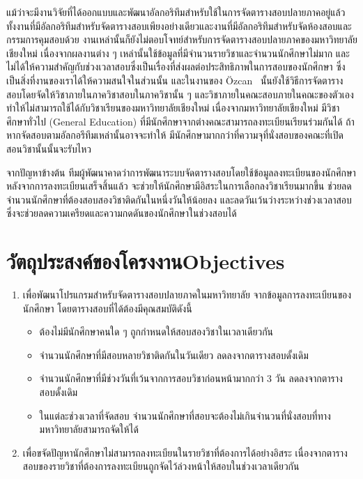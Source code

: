แม้ว่าจะมีงานวิจัยที่ได้ออกแบบและพัฒนาอัลกอริทึมสำหรับใช้ในการจัดตารางสอบปลายภาคอยู่แล้ว \cite{graphcl-constr-manip} \\ \cite{graphcl-2008}\cite{fes}\cite{graphcl-alter-approach}\cite{graphcl-idepset} 
ทั้งงานที่มีอัลกอริทึมสำหรับจัดตารางสอบเพียงอย่างเดียวและงานที่มีอัลกอริทึมสำหรับจัดห้องสอบและกรรมการคุมสอบด้วย
งานเหล่านั้นก็ยังไม่ตอบโจทย์สำหรับการจัดตารางสอบปลายภาคของมหาวิทยาลัยเชียงใหม่ 
เนื่องจากผลงานต่าง ๆ เหล่านั้นใช้ข้อมูลที่มีจำนวนรายวิชาและจำนวนนักศึกษาไม่มาก และไม่ได้ให้ความสำคัญกับช่วงเวลาสอบซึ่งเป็นเรื่องที่ส่งผลต่อประสิทธิภาพในการสอบของนักศึกษา 
ซึ่งเป็นสิ่งที่งานของเราได้ให้ความสนใจในส่วนนั้น และในงานของ {\"O}zcan~\cite{fes} นั้นยังใช้วิธีการจัดตารางสอบโดยจัดให้วิชาภายในภาควิชาสอบในภาควิชานั้น ๆ และวิชาภายในคณะสอบภายในคณะของตัวเอง
ทำให้ไม่สามารถใช้ได้กับวิชาเรียนของมหาวิทยาลัยเชียงใหม่ เนื่องจากมหาวิทยาลัยเชียงใหม่ มีวิชาศึกษาทั่วไป (General Education) ที่มีนักศึกษาจากต่างคณะสามารถลงทะเบียนเรียนร่วมกันได้ ถ้าหากจัดสอบตามอัลกอรึทึมเหล่านั้นอาจจะทำให้
มีนักศึกษามากกว่าที่ความจุที่นั่งสอบของคณะที่เปิดสอนวิชานั้นนั้นจะรับไหว


จากปัญหาข้างต้น ทีมผู้พัฒนาคาดว่าการพัฒนาระบบจัดตารางสอบโดยใช้ข้อมูลลงทะเบียนของนักศึกษา หลังจากการลงทะเบียนเสร็จสิ้นแล้ว 
จะช่วยให้นักศึกษามีอิสระในการเลือกลงวิชาเรียนมากขึ้น ช่วยลดจำนวนนักศึกษาที่ต้องสอบสองวิชาติดกันในหนึ่งวันให้น้อยลง และลดวันเว้นว่างระหว่างช่วงเวลาสอบ
ซึ่งจะช่วยลดความเครียดและความกดดันของนักศึกษาในช่วงสอบได้

\section{\ifcpe วัตถุประสงค์ของโครงงาน\else Objectives\fi}
\label{sec:Objectives}
\begin{enumerate}
    \item เพื่อพัฒนาโปรแกรมสำหรับจัดตารางสอบปลายภาคในมหาวิทยาลัย จากข้อมูลการลงทะเบียนของนักศึกษา โดยตารางสอบที่ได้ต้องมีคุณสมบัติดังนี้
    \begin{itemize}
        \item ต้องไม่มีนักศึกษาคนใด ๆ ถูกกำหนดให้สอบสองวิชาในเวลาเดียวกัน
        \item จำนวนนักศึกษาที่มีสอบหลายวิชาติดกันในวันเดียว ลดลงจากตารางสอบดั้งเดิม
        \item จำนวนนักศึกษาที่มีช่วงวันที่เว้นจากการสอบวิชาก่อนหน้ามากกว่า 3 วัน ลดลงจากตารางสอบดั้งเดิม
        \item ในแต่ละช่วงเวลาที่จัดสอบ จำนวนนักศึกษาที่สอบจะต้องไม่เกินจำนวนที่นั่งสอบที่ทางมหาวิทยาลัยสามารถจัดให้ได้
    \end{itemize}
    \item เพื่อขจัดปัญหานักศึกษาไม่สามารถลงทะเบียนในรายวิชาที่ต้องการได้อย่างอิสระ เนื่องจากตารางสอบของรายวิชาที่ต้องการลงทะเบียนถูกจัดไว้ล่วงหน้าให้สอบในช่วงเวลาเดียวกัน
\end{enumerate}

